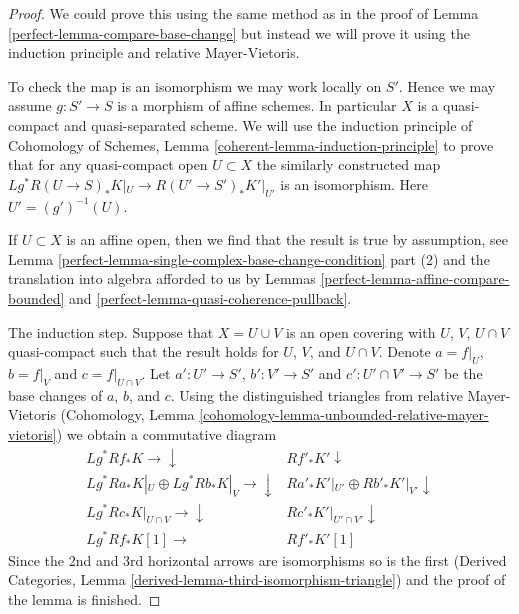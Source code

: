 \begin{proof}

We could prove this using the same method as in the proof of
Lemma \ref{perfect-lemma-compare-base-change} but instead we will prove
it using the induction principle and relative Mayer-Vietoris.

\medskip\noindent
To check the map is an isomorphism we may work locally on $S'$.
Hence we may assume $g : S' \to S$ is a morphism of affine schemes.
In particular $X$ is a quasi-compact and quasi-separated scheme.
We will use the induction principle of
Cohomology of Schemes, Lemma \ref{coherent-lemma-induction-principle}
to prove that for any quasi-compact open $U \subset X$ the similarly
constructed map $Lg^*R(U \to S)_*K|_U \to R(U' \to S')_*K'|_{U'}$
is an isomorphism. Here $U' = (g')^{-1}(U)$.

\medskip\noindent
If $U \subset X$ is an affine open, then we find that the result is
true by assumption, see
Lemma \ref{perfect-lemma-single-complex-base-change-condition} part (2)
and the translation into algebra afforded to us
by Lemmas \ref{perfect-lemma-affine-compare-bounded} and
\ref{perfect-lemma-quasi-coherence-pullback}.

\medskip\noindent
The induction step. Suppose that $X = U \cup V$ is an open covering
with $U$, $V$, $U \cap V$
quasi-compact such that the result holds for $U$, $V$, and $U \cap V$.
Denote $a = f|_U$, $b = f|_V$ and $c = f|_{U \cap V}$.
Let $a' : U' \to S'$, $b' : V' \to S'$ and $c' : U' \cap V' \to S'$
be the base changes of $a$, $b$, and $c$.
Using the distinguished triangles from relative Mayer-Vietoris
(Cohomology, Lemma \ref{cohomology-lemma-unbounded-relative-mayer-vietoris})
we obtain a commutative diagram
$$
\begin{array}{cc}Lg^*Rf_*K \longrightarrow\downarrow & Rf'_* K' \downarrow \\ Lg^*Ra_* K|_U \oplus
Lg^*Rb_* K|_V \longrightarrow\downarrow & Ra'_* K'|_{U'} \oplus
Rb'_* K'|_{V'} \downarrow \\ Lg^*Rc_* K|_{U \cap V} \longrightarrow\downarrow & Rc'_* K'|_{U' \cap V'} \downarrow \\ Lg^*Rf_* K[1] \longrightarrow & Rf'_* K'[1]\end{array}
$$
Since the 2nd and 3rd horizontal arrows are isomorphisms so is the first
(Derived Categories, Lemma \ref{derived-lemma-third-isomorphism-triangle})
and the proof of the lemma is finished.
\end{proof}

